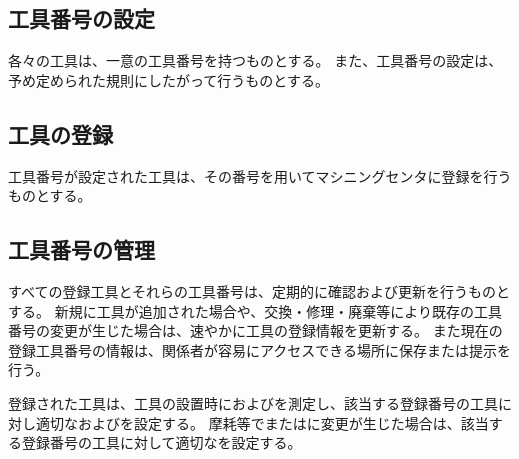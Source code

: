 





\subsection{工具番号の設定}
各々の工具は、一意の工具番号を持つものとする。
また、工具番号の設定は、予め定められた規則にしたがって行うものとする。

\subsection{工具の登録}
工具番号が設定された工具は、その番号を用いてマシニングセンタに登録を行うものとする。

\subsection{工具番号の管理}
すべての登録工具とそれらの工具番号は、定期的に確認および更新を行うものとする。
新規に工具が追加された場合や、交換・修理・廃棄等により既存の工具番号の変更が生じた場合は、速やかに工具の登録情報を更新する。
また現在の登録工具番号の情報は、関係者が容易にアクセスできる場所に保存または提示を行う。



登録された工具は、工具の設置時に\ToolLength および\ToolDiameter を測定し、該当する登録番号の工具に対し適切な\TLCValue および\TDCValue を設定する。
摩耗等で\ToolLength または\ToolDiameter に変更が生じた場合は、該当する登録番号の工具に対して適切な\ToolWearValue を設定する。

